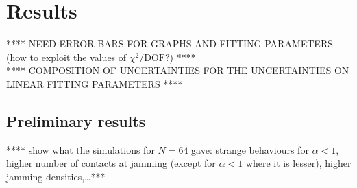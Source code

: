 \documentclass[class=report, float=false, crop=false]{standalone}
\begin{document}
\chapter{Results}
\label{chap:results}

**** NEED ERROR BARS FOR GRAPHS AND FITTING PARAMETERS (how to exploit the values of $\chi^2/\text{DOF}$?) ****\\

**** COMPOSITION OF UNCERTAINTIES FOR THE UNCERTAINTIES ON LINEAR FITTING PARAMETERS ****

\section{Preliminary results}

**** show what the simulations for $N=64$ gave: strange behaviours for $\alpha<1$, higher number of contacts at jamming (except for $\alpha<1$ where it is lesser), higher jamming densities,\ldots ****

% 
\end{document}
